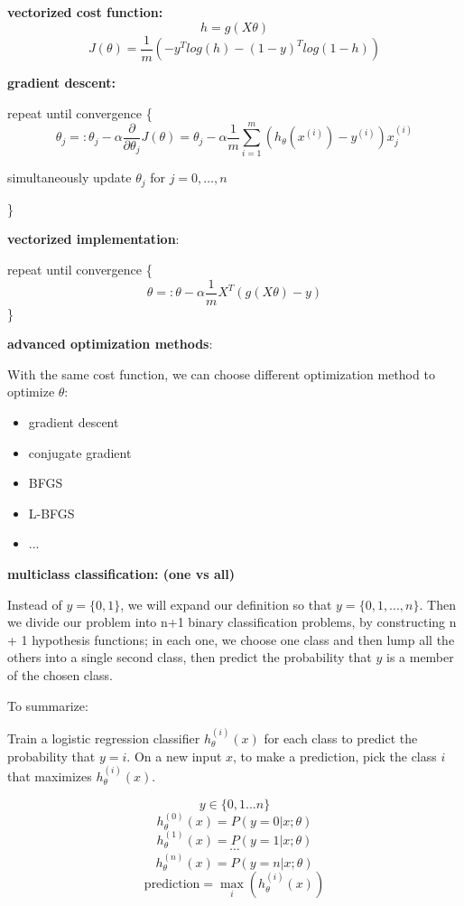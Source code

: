 \documentclass{article}
\begin{document}
\noindent \textbf{vectorized cost function:}
\[h = g(X\theta)\]
\[J(\theta) = \frac{1}{m} (- y^T log(h) - (1 - y)^T log(1 - h))\]

\noindent \textbf{gradient descent:}

\noindent repeat until convergence \{
\[\theta_j =: \theta_j - \alpha \frac{\partial}{\partial \theta_j} J(\theta) = \theta_j - \alpha \frac{1}{m} \sum_{i = 1}^m (h_{\theta}(x^{(i)}) - y^{(i)}) x^{(i)}_j\]
\centerline{simultaneously update \(\theta_j\) for \(j = 0, \dots, n\)}
\}

\bigskip

\noindent \textbf{vectorized implementation}:

\noindent repeat until convergence \{
\[\theta =: \theta - \alpha \frac{1}{m} X^T (g(X\theta) - y)\]
\}

\bigskip

\noindent \textbf{advanced optimization methods}:

\noindent With the same cost function, we can choose different optimization method to optimize \(\theta\):

\begin{itemize}
\item gradient descent
\item conjugate gradient
\item BFGS
\item L-BFGS
\item ...
\end{itemize}

\bigskip

\noindent \textbf{multiclass classification: (one vs all)}

\noindent Instead of \(y = \{0, 1\}\), we will expand our definition so that \(y = \{0, 1, ..., n\}\). Then we divide our problem into n+1 binary classification problems, by constructing n + 1 hypothesis functions; in each one, we choose one class and then lump all the others into a single second class, then predict the probability that \(y\) is a member of the chosen class.

\bigskip

\noindent To summarize: 

\noindent Train a logistic regression classifier \(h_{\theta}^{(i)}(x)\) for each class to predict the probability that \(y = i\). On a new input \(x\), to make a prediction, pick the class \(i\) that maximizes \(h_{\theta} ^{(i)}(x)\).

\[y \in \{0, 1 ... n\}\] 
\[h_{\theta}^{(0)}(x) = P(y = 0 | x ; \theta)\]
\[h_{\theta}^{(1)}(x) = P(y = 1 | x ; \theta)\]
\[\cdots\]
\[h_{\theta}^{(n)}(x) = P(y = n | x ; \theta)\] 
\[\text{prediction} = \max_i(h_{\theta}^{(i)}(x))\]
\end{document}
